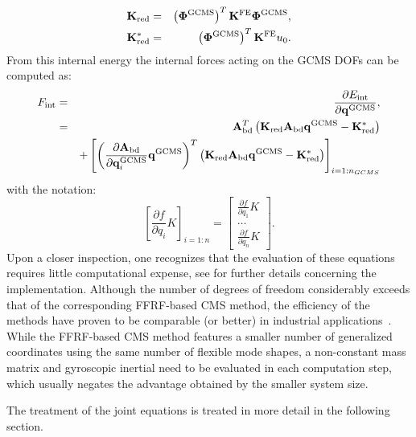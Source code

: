 \begin{eqnarray}
\mathbf K_{\rm red} &=& \left(\bm \Phi^{\rm GCMS}\right)^T\mathbf K^{\rm FE}\bm \Phi^{\rm GCMS}, \label{eq:Kred}\\
\mathbf K_{\rm red}^* &=& \left(\bm \Phi^{\rm GCMS}\right)^T\mathbf K^{\rm FE} u_0. \label{eq:Kred*}
\end{eqnarray}
From this internal energy the internal forces acting on the GCMS DOFs can be computed as:
\begin{eqnarray}
F_{\mathrm{int}} & = & \frac{\partial E_{\mathrm{int}}}{\partial \mathbf q^{\rm GCMS}}, \\
&=& \mathbf A_{\mathrm{bd}}^T\left(\mathbf K_{\rm red}\mathbf A_{\mathrm{bd}}\mathbf q^{\rm GCMS}-\mathbf K_{\rm red}^*\right) \nonumber \\
&& + \left[\left(\frac{\partial\mathbf A_{\mathrm{bd}}}{\partial\mathbf q^{\rm GCMS}_i}\mathbf q^{\rm GCMS}\right)^T\left(\mathbf K_{\rm red}\mathbf A_{\mathrm{bd}}\mathbf q^{\rm GCMS}-\mathbf K_{\rm red}^*\right)\right]_{i=1:n_{GCMS}}
\end{eqnarray}
with the notation:
\begin{equation}
\left[\frac{\partial f}{\partial q_i}K\right]_{i=1:n} = \begin{bmatrix} \frac{\partial f}{\partial q_1}K \\ \ldots \\ \frac{\partial f}{\partial q_n}K\end{bmatrix}. 
\end{equation}
Upon a closer inspection, one recognizes that the evaluation of these equations requires little computational expense, see \cite{pechstein2013} for further details concerning the implementation.
Although the number of degrees of freedom considerably exceeds that of the corresponding FFRF-based CMS method, the efficiency of the methods have proven to be comparable (or better) in industrial applications~\cite{pechstein2013}.
While the FFRF-based CMS method features a smaller number of generalized coordinates using the same number of flexible mode shapes, a non-constant mass matrix and gyroscopic inertial need to be evaluated in each computation step, which usually negates the advantage obtained by the smaller system size.

The treatment of the joint equations is treated in more detail in the following section. 


